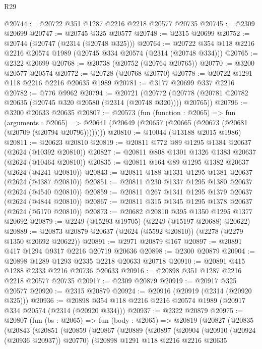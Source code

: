\begin{lexlean}{R29}
\begin{coremodule}
@20744 := @20722 @351 @1287 @2216 @2218 @20577 @20735
@20745 := @2309 @20699
@20747 := @20745 @325 @20577
@20748 := @2315 @20699
@20752 := @20744 (@20747 (@2314 (@20748 @325)))
@20764 := @20722 @354 @118 @2216 @2216 @20574 @1989 (@20745 @334 @20574 (@2314 (@20748 @334)))
@20765 := @2322 @20699
@20768 := @20738 (@20752 (@20764 @20765))
@20770 := @3200 @20577 @20574
@20772 := @20728 (@20768 @20770)
@20778 := @20722 @1291 @118 @2216 @2216 @20635 @1989
@20781 := @3177 @20699 @337 @2216
@20782 := @776 @9962
@20794 := @20721
    (@20772 (@20778 (@20781 @20782 @20635 (@20745 @320 @20580 (@2314 (@20748 @320)))) @20765))
@20796 := @3200 @20633 @20635
@20807 := @20573
    (fun (function : @2065) =>
    fun (arguments : @2065) =>
    @20641 (@20649 (@20657 (@20665 (@20673 (@20681 (@20709 (@20794 @20796))))))))
@20810 := @10044 (@13188 @2015 @1986)
@20811 := @20623 @20810
@20819 := @20811 @772 @89 @1295 @1384 @20637 (@2624 (@10392 @20810))
@20827 := @20811 @808 @1301 @1326 @1383 @20637 (@2624 (@10464 @20810))
@20835 := @20811 @164 @89 @1295 @1382 @20637 (@2624 (@4241 @20810))
@20843 := @20811 @188 @1331 @1295 @1381 @20637 (@2624 (@4387 @20810))
@20851 := @20811 @230 @1337 @1295 @1380 @20637 (@2624 (@4540 @20810))
@20859 := @20811 @267 @1341 @1295 @1379 @20637 (@2624 (@4844 @20810))
@20867 := @20811 @315 @1345 @1295 @1378 @20637 (@2624 (@5170 @20810))
@20873 := @20682 @20810 @395 @1350 @1295 @1377 @20692
@20879 := @2249 (@15293 @19705) (@2249 (@15197 @20688) @20622)
@20889 := @20873 @20879 @20637 (@2624 (@5592 @20810)) (@2278 (@2279 @1350 @20692 @20622))
@20891 := @2971 @20879 @167
@20897 := @20891 @417 @1294 @9317 @2216 @20719 @20636
@20898 := @2300 @20879
@20904 := @20898 @1289 @1293 @2335 @2218 @20633 @20718
@20910 := @20891 @415 @1288 @2333 @2216 @20736 @20633
@20916 := @20898 @351 @1287 @2216 @2218 @20577 @20735
@20917 := @2309 @20879
@20919 := @20917 @325 @20577
@20920 := @2315 @20879
@20924 := @20916 (@20919 (@2314 (@20920 @325)))
@20936 := @20898 @354 @118 @2216 @2216 @20574 @1989 (@20917 @334 @20574 (@2314 (@20920 @334)))
@20937 := @2322 @20879
@20975 := @20807
    (fun (bs : @2065) =>
    fun (body : @2065) =>
    @20819
      (@20827
        (@20835
          (@20843
            (@20851
              (@20859
                (@20867
                  (@20889
                    (@20897
                      (@20904
                        (@20910 (@20924 (@20936 @20937)) @20770)
                        (@20898
                          @1291
                          @118
                          @2216
                          @2216
                          @20635

\end{coremodule}
\end{lexlean}
